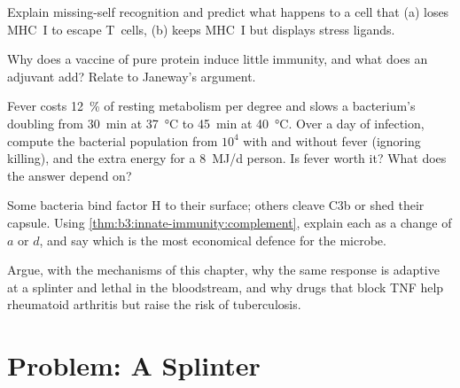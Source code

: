 \begin{exercise}[$\star\star$]\label{exo:b3:innate-immunity:8}
Explain missing-self recognition and predict what happens to a 
cell that (a) loses MHC~I to escape T~cells, (b) keeps MHC~I but
displays stress ligands.
\end{exercise}

\begin{exercise}[$\star\star$]\label{exo:b3:innate-immunity:9}
Why does a vaccine of pure protein induce little immunity, and what
does an adjuvant add? Relate to Janeway's argument.
\end{exercise}

\begin{exercise}[$\star\star\star$]\label{exo:b3:innate-immunity:10}
Fever costs \qty{12}{\%} of resting metabolism per degree and slows a
bacterium's doubling from \qty{30}{min} at \qty{37}{\celsius} to
\qty{45}{min} at \qty{40}{\celsius}. Over a day of infection, compute
the bacterial population from $10^{4}$ with and without fever
(ignoring killing), and the extra energy for a \qty{8}{MJ/d} person.
Is fever worth it? What does the answer depend on?
\end{exercise}

\begin{exercise}[$\star\star\star$]\label{exo:b3:innate-immunity:11}
Some bacteria bind factor H to their surface; others cleave C3b or
shed their capsule. Using \cref{thm:b3:innate-immunity:complement},
explain each as a change of $a$ or $d$, and say which is the most
economical defence for the microbe.
\end{exercise}

\begin{exercise}[$\star\star\star$]\label{exo:b3:innate-immunity:12}
Argue, with the mechanisms of this chapter, why the same response is
adaptive at a splinter and lethal in the bloodstream, and why drugs
that block TNF help rheumatoid arthritis but raise the risk of
tuberculosis.
\end{exercise}

\section{Problem: A Splinter}

